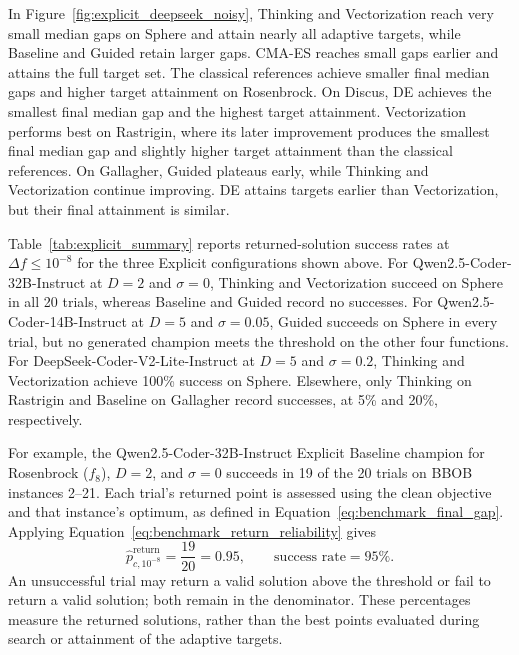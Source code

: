 In Figure~\ref{fig:explicit_deepseek_noisy}, Thinking and Vectorization
reach very small median gaps on Sphere and attain nearly all adaptive
targets, while Baseline and Guided retain larger gaps. CMA-ES reaches
small gaps earlier and attains the full target set. The classical
references achieve smaller final median gaps and higher target
attainment on Rosenbrock. On Discus, DE achieves the smallest final
median gap and the highest target attainment. Vectorization performs
best on Rastrigin, where its later improvement produces the smallest
final median gap and slightly higher target attainment than the
classical references. On Gallagher, Guided plateaus early, while
Thinking and Vectorization continue improving. DE attains targets
earlier than Vectorization, but their final attainment is similar.

\FloatBarrier

Table~\ref{tab:explicit_summary} reports returned-solution success
rates at $\Delta f\leq10^{-8}$ for the three Explicit configurations
shown above. For Qwen2.5-Coder-32B-Instruct at $D=2$ and $\sigma=0$,
Thinking and Vectorization succeed on Sphere in all 20 trials,
whereas Baseline and Guided record no successes. For
Qwen2.5-Coder-14B-Instruct at $D=5$ and $\sigma=0.05$, Guided
succeeds on Sphere in every trial, but no generated champion meets
the threshold on the other four functions. For
DeepSeek-Coder-V2-Lite-Instruct at $D=5$ and $\sigma=0.2$,
Thinking and Vectorization achieve 100\% success on Sphere.
Elsewhere, only Thinking on Rastrigin and Baseline on Gallagher
record successes, at 5\% and 20\%, respectively.

For example, the Qwen2.5-Coder-32B-Instruct Explicit Baseline
champion for Rosenbrock ($f_8$), $D=2$, and $\sigma=0$ succeeds
in 19 of the 20 trials on BBOB instances 2--21. Each trial's
returned point is assessed using the clean objective and that
instance's optimum, as defined in
Equation~\eqref{eq:benchmark_final_gap}. Applying
Equation~\eqref{eq:benchmark_return_reliability} gives
\begin{equation}
    \widehat p_{c,10^{-8}}^{\mathrm{return}}
    = \frac{19}{20}
    = 0.95,
    \qquad \text{success rate} = 95\%.
    \label{eq:experiment_success_rate_example}
\end{equation}
An unsuccessful trial may return a valid solution above the
threshold or fail to return a valid solution; both remain in the
denominator. These percentages measure the returned solutions,
rather than the best points evaluated during search or attainment
of the adaptive targets.

